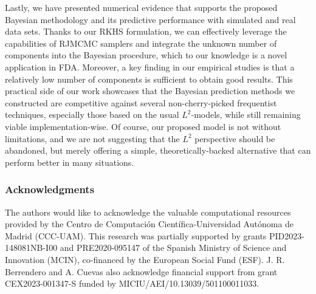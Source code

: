 \documentclass{article}
\numberwithin{equation}{section}
\theoremstyle{plain}
\theoremstyle{definition}
\begin{document}
Lastly, we have presented numerical evidence that supports the proposed Bayesian methodology and its predictive performance with simulated and real data sets. Thanks to our RKHS formulation, we can effectively leverage the capabilities of RJMCMC samplers and integrate the unknown number of components into the Bayesian procedure, which to our knowledge is a novel application in FDA. Moreover, a key finding in our empirical studies is that a relatively low number of components is sufficient to obtain good results. This practical side of our work showcases that the Bayesian prediction methods we constructed are competitive against several non-cherry-picked frequentist techniques, especially those based on the usual \(L^2\)-models, while still remaining viable implementation-wise. Of course, our proposed model is not without limitations, and we are not suggesting that the \(L^2\) perspective should be abandoned, but merely offering a simple, theoretically-backed alternative that can perform better in many situations.



  {\footnotesize
  \subsubsection*{Acknowledgments}
    The authors would like to acknowledge the valuable computational resources provided by the Centro de Computación Científica-Universidad Autónoma de Madrid (CCC-UAM). This research was partially supported by grants PID2023-148081NB-I00 and PRE2020-095147 of the Spanish Ministry of Science and Innovation (MCIN), co-financed by the European Social Fund (ESF). J. R. Berrendero and A. Cuevas also acknowledge financial support from grant CEX2023-001347-S funded by MICIU/AEI/10.13039/501100011033.
    }







\newpage
\appendix
{} %

\end{document}
